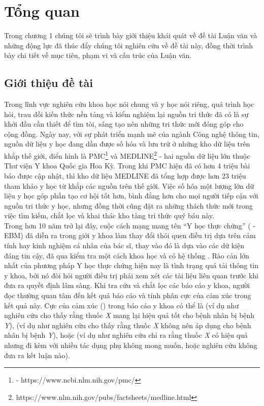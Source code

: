 \section{Tổng quan}
Trong chương 1 chúng tôi sẽ trình bày giới thiệu khái quát về đề tài Luận văn và những động lực đã thúc đẩy chúng tôi nghiên cứu về đề tài này, đồng thời trình bày chi tiết về mục tiêu, phạm vi và cấu trúc của Luận văn.
\subsection{Giới thiệu đề tài}
Trong lĩnh vực nghiên cứu khoa học nói chung và y học nói riêng, quá trình học hỏi, trau dồi kiến thức nền tảng và kiểm nghiệm lại nguồn tri thức đã có là sự khởi đầu cần thiết để tìm tòi, sáng tạo nên những tri thức mới đóng góp cho cộng đồng. Ngày nay, với sự phát triển mạnh mẽ của ngành Công nghệ thông tin, nguồn dữ liệu y học đang dần được số hóa và lưu trữ ở những kho dữ liệu trên khắp thế giới, điển hình là PMC\footnote{ - https://www.ncbi.nlm.nih.gov/pmc/} và MEDLINE\footnote{https://www.nlm.nih.gov/pubs/factsheets/medline.html} - hai nguồn dữ liệu lớn thuộc Thư viện Y khoa Quốc gia Hoa Kỳ. Trong khi PMC hiện đã có hơn 4 triệu bài báo được cập nhật, thì kho dữ liệu MEDLINE đã tổng hợp được hơn 23 triệu tham khảo y học từ khắp các nguồn trên thế giới. Việc số hóa một lượng lớn dữ liệu y học góp phần tạo cơ hội tốt hơn, bình đẳng hơn cho mọi người tiếp cận với nguồn tri thức y học, nhưng đồng thời cũng đặt ra những thách thức mới trong việc tìm kiếm, chắt lọc và khai thác kho tàng tri thức quý báu này.\\

Trong hơn 10 năm trở lại đây, cuộc cách mạng mang tên ``Y học thực chứng'' ( - EBM) đã diễn ra trong giới y khoa làm thay đổi thói quen điều trị dựa trên cảm tính hay kinh nghiệm cá nhân của bác sĩ, thay vào đó là dựa vào các dữ kiện đáng tin cậy, đã qua kiểm tra một cách khoa học và có hệ thống \cite{Nguyen2004}. Rào cản lớn nhất của phương pháp Y học thực chứng hiện nay là tình trạng quá tải thông tin y khoa, bởi nó đòi hỏi người điều trị phải xem xét các tài liệu liên quan trước khi đưa ra quyết định lâm sàng. Khi tra cứu và chắt lọc các báo cáo y khoa, người đọc thường quan tâm đến kết quả báo cáo và tính phân cực của cảm xúc trong kết quả này. Cực của cảm xúc () trong báo cáo y khoa có thể là \tichcuc (ví dụ như nghiên cứu cho thấy rằng thuốc \textit{X} mang lại hiệu quả tốt cho bệnh nhân bị bệnh \textit{Y}), \tieucuc (ví dụ như nghiên cứu cho thấy rằng thuốc \textit{X} không nên áp dụng cho bệnh nhân bị bệnh \textit{Y}), hoặc \trungtinh (ví dụ như nghiên cứu chỉ ra rằng thuốc \textit{X} có hiệu quả nhưng đi kèm với nhiều tác dụng phụ không mong muốn, hoặc nghiên cứu không đưa ra kết luận nào).\\

